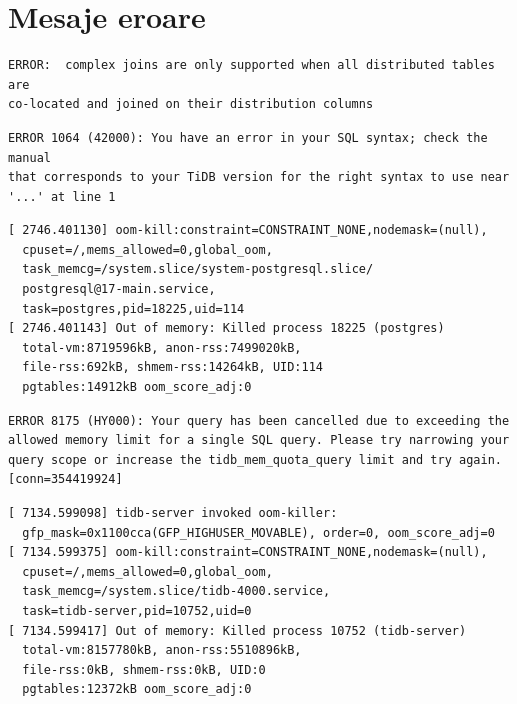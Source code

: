 \chapter{Mesaje eroare}

\begin{lstlisting}[language={}, caption={Citus -- eroare Join distribuit}]
ERROR:  complex joins are only supported when all distributed tables are
co-located and joined on their distribution columns
\end{lstlisting}

\begin{lstlisting}[language={}, caption={TiDB -- eroare Q5}]
ERROR 1064 (42000): You have an error in your SQL syntax; check the manual
that corresponds to your TiDB version for the right syntax to use near
'...' at line 1
\end{lstlisting}

\begin{lstlisting}[language={}, caption={Citus -- OOM killer, nod worker, Q18, 16 GB RAM}]
[ 2746.401130] oom-kill:constraint=CONSTRAINT_NONE,nodemask=(null),
  cpuset=/,mems_allowed=0,global_oom,
  task_memcg=/system.slice/system-postgresql.slice/
  postgresql@17-main.service,
  task=postgres,pid=18225,uid=114
[ 2746.401143] Out of memory: Killed process 18225 (postgres)
  total-vm:8719596kB, anon-rss:7499020kB,
  file-rss:692kB, shmem-rss:14264kB, UID:114
  pgtables:14912kB oom_score_adj:0
\end{lstlisting}

\begin{lstlisting}[language={}, caption={TiDB -- eroare SQL quota Q18},]
ERROR 8175 (HY000): Your query has been cancelled due to exceeding the
allowed memory limit for a single SQL query. Please try narrowing your
query scope or increase the tidb_mem_quota_query limit and try again.
[conn=354419924]
\end{lstlisting}

\begin{lstlisting}[language={}, caption={TiDB -- OOM killer, nod SQL, Q18, 16 GB RAM}]
[ 7134.599098] tidb-server invoked oom-killer:
  gfp_mask=0x1100cca(GFP_HIGHUSER_MOVABLE), order=0, oom_score_adj=0
[ 7134.599375] oom-kill:constraint=CONSTRAINT_NONE,nodemask=(null),
  cpuset=/,mems_allowed=0,global_oom,
  task_memcg=/system.slice/tidb-4000.service,
  task=tidb-server,pid=10752,uid=0
[ 7134.599417] Out of memory: Killed process 10752 (tidb-server)
  total-vm:8157780kB, anon-rss:5510896kB,
  file-rss:0kB, shmem-rss:0kB, UID:0
  pgtables:12372kB oom_score_adj:0
\end{lstlisting}